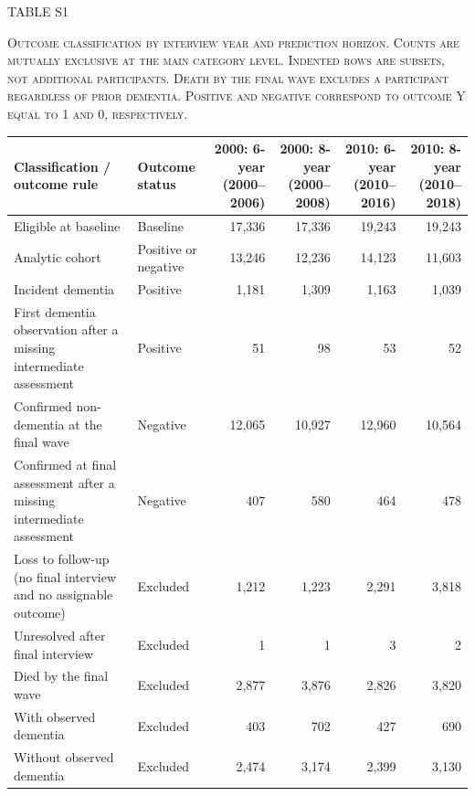 \documentclass[10pt]{article}
\begin{document}
\begin{center}
{\normalsize TABLE S1\par}
\vspace{2pt}
{\small\scshape Outcome classification by interview year and prediction horizon. Counts are mutually exclusive at the main category level. Indented rows are subsets, not additional participants. Death by the final wave excludes a participant regardless of prior dementia. Positive and negative correspond to outcome Y equal to 1 and 0, respectively.\par}
\end{center}
\vspace{6pt}
\footnotesize
\renewcommand{\arraystretch}{1.25}
\setlength{\tabcolsep}{5pt}
\noindent\begin{tabularx}{\textwidth}{@{}L >{\raggedright\arraybackslash}p{30mm} R R R R@{}}
\toprule
\textbf{Classification / outcome rule} & \textbf{Outcome status} & \textbf{2000: 6-year} \newline \textbf{(2000--2006)} & \textbf{2000: 8-year} \newline \textbf{(2000--2008)} & \textbf{2010: 6-year} \newline \textbf{(2010--2016)} & \textbf{2010: 8-year} \newline \textbf{(2010--2018)} \\
\midrule
Eligible at baseline & Baseline & 17,336 & 17,336 & 19,243 & 19,243 \\
Analytic cohort & Positive or negative & 13,246 & 12,236 & 14,123 & 11,603 \\
Incident dementia & Positive & 1,181 & 1,309 & 1,163 & 1,039 \\
\hspace*{1em}First dementia observation after a missing intermediate assessment & Positive & 51 & 98 & 53 & 52 \\
Confirmed non-dementia at the final wave & Negative & 12,065 & 10,927 & 12,960 & 10,564 \\
\hspace*{1em}Confirmed at final assessment after a missing intermediate assessment & Negative & 407 & 580 & 464 & 478 \\
Loss to follow-up (no final interview and no assignable outcome) & Excluded & 1,212 & 1,223 & 2,291 & 3,818 \\
Unresolved after final interview & Excluded & 1 & 1 & 3 & 2 \\
Died by the final wave & Excluded & 2,877 & 3,876 & 2,826 & 3,820 \\
\hspace*{1em}With observed dementia & Excluded & 403 & 702 & 427 & 690 \\
\hspace*{1em}Without observed dementia & Excluded & 2,474 & 3,174 & 2,399 & 3,130 \\
\bottomrule
\end{tabularx}
\end{document}
